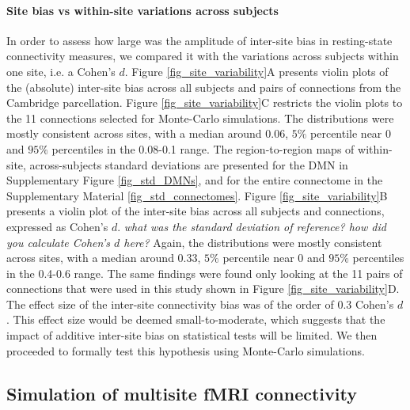 \documentclass[authoryear]{elsarticle}
\begin{document}
\paragraph{Site bias vs within-site variations across subjects} In order to assess how large was the amplitude of inter-site bias in resting-state connectivity measures, we compared it with the variations across subjects within one site, i.e. a Cohen's $d$. Figure \ref{fig_site_variability}A presents violin plots of the (absolute) inter-site bias across all subjects and pairs of connections from the Cambridge parcellation. Figure \ref{fig_site_variability}C restricts the violin plots to the 11 connections selected for Monte-Carlo simulations. The distributions were mostly consistent across sites, with a median around 0.06, $5\%$ percentile near 0 and $95\%$ percentiles in the 0.08-0.1 range. The region-to-region maps of within-site, across-subjects standard deviations are presented for the DMN in Supplementary Figure \ref{fig_std_DMNs}, and for the entire connectome in the Supplementary Material \ref{fig_std_connectomes}. Figure \ref{fig_site_variability}B presents a violin plot of the inter-site bias across all subjects and connections, expressed as Cohen's $d$. \emph{what was the standard deviation of reference? how did you calculate Cohen's $d$ here?} Again, the distributions were mostly consistent across sites, with a median around 0.33, $5\%$ percentile near 0 and $95\%$ percentiles in the 0.4-0.6 range. The same findings were found only looking at the 11 pairs of connections that were used in this study shown in Figure \ref{fig_site_variability}D. The effect size of the inter-site connectivity bias was of the order of 0.3 Cohen's $d$. This effect size would be deemed small-to-moderate, which suggests that the impact of additive inter-site bias on statistical tests will be limited. We then proceeded to formally test this hypothesis using Monte-Carlo simulations.

\subsection{Simulation of multisite fMRI connectivity}
\end{document}

